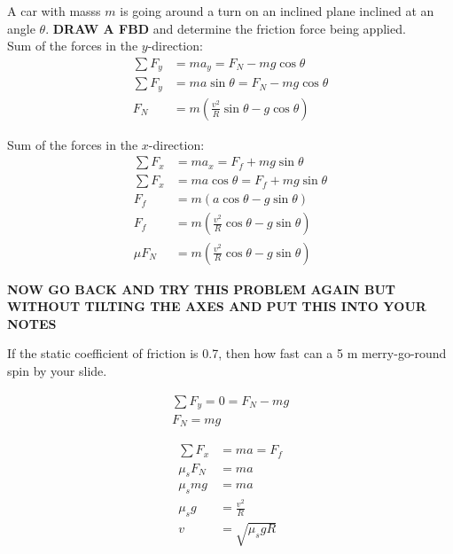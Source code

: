 \begin{problem}
	A car with masss $m$ is going around a turn on an inclined plane inclined at an angle $\theta$. \textbf{DRAW A FBD} and determine the friction force being applied.\\


	Sum of the forces in the $y$-direction:
	$$
	\begin{aligned}
		\sum F_y &= ma_y = F_N - mg\cos\theta\\
		\sum F_y &= ma\sin\theta = F_N - mg\cos\theta\\
		F_N &= m\left(\frac{v^2}{R}\sin\theta - g\cos\theta\right)
	\end{aligned}
	$$


	Sum of the forces in the $x$-direction:
	$$
	\begin{aligned}
		\sum F_x &= ma_x = F_f + mg\sin\theta\\
		\sum F_x &= ma\cos\theta = F_f + mg\sin\theta\\
		F_f &= m(a\cos\theta - g\sin\theta)\\
		F_f &= m\left(\frac{v^2}{R}\cos\theta - g\sin\theta\right)\\
		\mu F_N &= m\left(\frac{v^2}{R}\cos\theta - g\sin\theta\right)
	\end{aligned}
	$$

	\textbf{NOW GO BACK AND TRY THIS PROBLEM AGAIN BUT WITHOUT TILTING THE AXES AND PUT THIS INTO YOUR NOTES}
\end{problem}


\begin{problem}
	If the static coefficient of friction is 0.7, then how fast can a 5 m merry-go-round spin by your slide. 

	$$
	\begin{aligned}
		\sum F_y = 0 = F_N - mg\\
		F_N = mg
	\end{aligned}
	$$

	$$
	\begin{aligned}
		\sum F_x &= ma = F_f\\
		\mu_sF_N &= ma\\
		\mu_smg &= ma\\
		\mu_sg &= \frac{v^2}{R}\\
		v &= \sqrt{\mu_sgR}
	\end{aligned}
	$$
\end{problem}